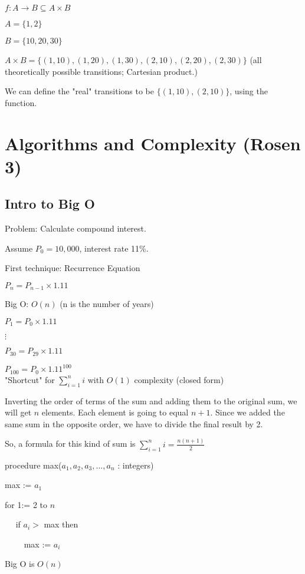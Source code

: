 \documentclass[english,openany]{book}
\begin{document}
    $f : A \rightarrow B \subseteq A \times B$

    $A = \{1,2\}$

    $B = \{10,20,30\}$

    $A \times B = \{(1,10),(1,20),(1,30),(2,10),(2,20),(2,30)\}$ (all theoretically possible transitions; Cartesian product.)

    We can define the "real" transitions to be $\{(1,10),(2,10)\}$, using the function.

    \chapter{Algorithms and Complexity (Rosen 3)}

    \section{Intro to Big O}

	Problem: Calculate compound interest.

    Assume $P_0 = 10,000$, interest rate 11\%.

    First technique: Recurrence Equation

    $P_n = P_{n-1} \times 1.11$

    Big O: $O(n)$ (n is the number of years)

    $P_1 = P_0 \times 1.11$

    $\vdots$

    $P_{30} = P_{29} \times 1.11$

    $P_{100} = P_0 \times 1.11^{100}$\\

    "Shortcut" for $\sum_{i=1}^{n} i$ with $O(1)$ complexity (closed form)

    Inverting the order of terms of the sum and adding them to the original sum, we will get $n$ elements. Each element is going to equal $n+1$. Since we added the same sum in the opposite order, we have to divide the final result by 2.

    So, a formula for this kind of sum is  $\sum_{i=1}^{n} i = \frac{n(n+1)}{2}$

    procedure max($a_1, a_2, a_3, ..., a_n$ : integers)

    max := $a_1$

    for 1:= 2 to $n$

    $\quad$ if $a_i > $ max then

         $\quad\quad$ max := $a_i$

    Big O is $O(n)$\\
\end{document}
